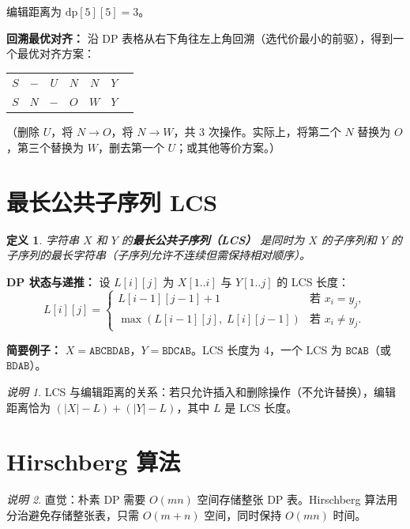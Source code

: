 \documentclass[UTF8,openany,12pt]{ctexbook}
\newtheorem{definition}{定义}[chapter]
\theoremstyle{remark}
\newtheorem{remark}{说明}[chapter]
\begin{document}
编辑距离为 $\mathrm{dp}[5][5] = 3$。

\textbf{回溯最优对齐：} 沿 DP 表格从右下角往左上角回溯（选代价最小的前驱），得到一个最优对齐方案：

\begin{center}
\begin{tabular}{@{}ccccccc@{}}
$S$ & $-$ & $U$ & $N$ & $N$ & $Y$ & \\
$S$ & $N$ & $-$ & $O$ & $W$ & $Y$ & \\
\end{tabular}
\end{center}

（删除 $U$，将 $N\to O$，将 $N\to W$，共 3 次操作。实际上，将第二个 $N$ 替换为 $O$，第三个替换为 $W$，删去第一个 $U$；或其他等价方案。）

\section{最长公共子序列 LCS}

\begin{definition}
字符串 $X$ 和 $Y$ 的\textbf{最长公共子序列（LCS）} 是同时为 $X$ 的子序列和 $Y$ 的子序列的最长字符串（子序列允许不连续但需保持相对顺序）。
\end{definition}

\textbf{DP 状态与递推：} 设 $L[i][j]$ 为 $X[1..i]$ 与 $Y[1..j]$ 的 LCS 长度：
\[
  L[i][j] = \begin{cases}
    L[i-1][j-1] + 1 & \text{若 } x_i = y_j, \\
    \max(L[i-1][j],\; L[i][j-1]) & \text{若 } x_i \neq y_j.
  \end{cases}
\]

\textbf{简要例子：} $X = \texttt{ABCBDAB}$，$Y = \texttt{BDCAB}$。LCS 长度为 4，一个 LCS 为 $\texttt{BCAB}$（或 $\texttt{BDAB}$）。

\begin{remark}
LCS 与编辑距离的关系：若只允许插入和删除操作（不允许替换），编辑距离恰为 $(|X| - L) + (|Y| - L)$，其中 $L$ 是 LCS 长度。
\end{remark}

\section{Hirschberg 算法}

\begin{remark}
直觉：朴素 DP 需要 $O(mn)$ 空间存储整张 DP 表。Hirschberg 算法用分治避免存储整张表，只需 $O(m+n)$ 空间，同时保持 $O(mn)$ 时间。
\end{remark}
\end{document}

